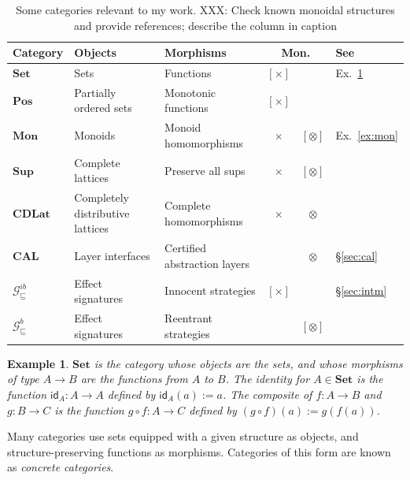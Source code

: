 \documentclass[11pt,oneside,draft]{book}
\newtheorem{example}[theorem]{Example}
\theoremstyle{definition}
\newcommand{\gcat}{\mathcal{G}_{\sqsubseteq}}
\newcommand{\kw}[1]{\ensuremath{ \mathsf{#1} }}
\begin{document}
\begin{table} %
  \centering
  \begin{tabular}{lllc@{ }cl}
    \hline
    Category & Objects & Morphisms &
      \multicolumn{2}{c}{Mon.} & See \\
    \hline
    $\mathbf{Set}$ &
      Sets & Functions &
      $[\times]$ & &
      Ex.~\ref{ex:set} \\
    $\mathbf{Pos}$ &
      Partially ordered sets & Monotonic functions &
      $[\times]$ & \\
    $\mathbf{Mon}$ &
      Monoids & Monoid homomorphisms &
      $\times$ & $[\otimes]$ &
      Ex.~\ref{ex:mon} \\
    $\mathbf{Sup}$ &
      Complete lattices & Preserve all sups &
      $\times$ & $[\otimes]$ \\
    $\mathbf{CDLat}$ &
      Completely distributive lattices & Complete homomorphisms &
      $\times$ & $\otimes$ \\
    \hline
    $\mathbf{CAL}$ &
      Layer interfaces & Certified abstraction layers &
      & $\otimes$ &
      \S\ref{sec:cal} \\
    $\gcat^{ib}$ &
      Effect signatures & Innocent strategies &
      $[\times]$ & &
      \S\ref{sec:intm} \\
    $\gcat^{b}$ &
      Effect signatures & Reentrant strategies &
      & $[\otimes]$ \\
    \hline
  \end{tabular}
  \caption[Some categories relevant to my work]%
   {Some categories relevant to my work.
    XXX: Check known monoidal structures and provide references;
    describe the column in caption}
  \label{tbl:cats}
\end{table}

\begin{example} \label{ex:set} %
$\mathbf{Set}$ is the category whose objects are the sets,
and whose morphisms of type $A \rightarrow B$
are the functions from $A$ to $B$.
The identity for $A \in \mathbf{Set}$
is the function $\kw{id}_A : A \rightarrow A$
defined by $\kw{id}_A(a) := a$.
The composite of $f : A \rightarrow B$ and
$g : B \rightarrow C$
is the function $g \circ f : A \rightarrow C$
defined by $(g \circ f)(a) := g(f(a))$.
\end{example}

Many categories use
sets equipped with a given structure as objects,
and structure-preserving functions as morphisms.
Categories of this form are known as \emph{concrete categories}.
\end{document}
